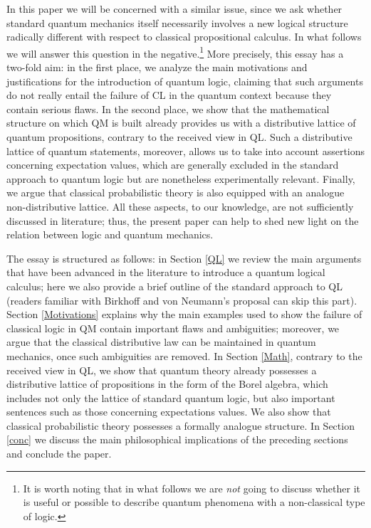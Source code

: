 \documentclass[11pt, executivepaper]{article}
\begin{document}
In this paper we will be concerned with a similar issue, since we ask whether standard quantum mechanics itself necessarily involves a new logical structure radically different with respect to classical propositional calculus. In what follows we will answer this question in the negative.\footnote{It is worth noting that in what follows we are \emph{not} going to discuss whether it is useful or possible to describe quantum phenomena with a non-classical type of logic.} More precisely, this essay has a two-fold aim: in the first place, we analyze the main motivations and justifications for the introduction of quantum logic, claiming that such arguments do not really entail the failure of CL in the quantum context because they contain serious flaws. In the second place, we show that the mathematical structure on which QM is built already provides us with a distributive lattice of quantum propositions, contrary to the received view in QL. Such a distributive lattice of quantum statements, moreover, allows us to take into account assertions concerning expectation values, which are generally excluded in the standard approach to quantum logic but are nonetheless experimentally relevant. Finally, we argue that classical probabilistic theory is also equipped with an analogue non-distributive lattice. All these aspects, to our knowledge, are not sufficiently discussed in literature; thus, the present paper can help to shed new light on the relation between logic and quantum mechanics.
\vspace{2mm}

The essay is structured as follows: in Section \ref{QL} we review the main arguments that have been advanced in the literature to introduce a quantum logical calculus; here we also provide a brief outline of the standard approach to QL (readers familiar with Birkhoff and von Neumann's proposal can skip this part). Section \ref{Motivations} explains why the main examples used to show the failure of classical logic in QM contain important flaws and ambiguities; moreover, we argue that the classical distributive law can be maintained in quantum mechanics, once such ambiguities are removed. In Section \ref{Math}, contrary to the received view in QL, we show that quantum theory already possesses a distributive lattice of propositions in the form of the Borel algebra, which includes not only the lattice of standard quantum logic, but also important sentences such as those concerning expectations values. We also show that classical probabilistic theory possesses a formally analogue structure. In Section \ref{conc} we discuss the main philosophical implications of the preceding sections and conclude the paper.
\end{document}
